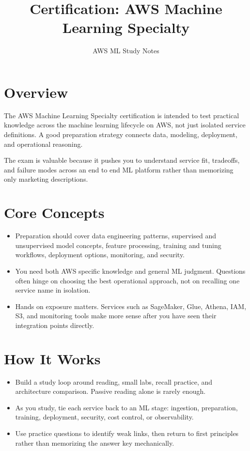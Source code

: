 \documentclass[10pt,twocolumn]{article}
\begin{document}
\title{\vspace{-1.6cm}Certification: AWS Machine Learning Specialty}
\author{AWS ML Study Notes}
\date{}
\maketitle
\small

\section*{Overview}
The AWS Machine Learning Specialty certification is intended to test practical knowledge across the machine learning lifecycle on AWS, not just isolated service definitions. A good preparation strategy connects data, modeling, deployment, and operational reasoning.

The exam is valuable because it pushes you to understand service fit, tradeoffs, and failure modes across an end to end ML platform rather than memorizing only marketing descriptions.

\section*{Core Concepts}
\begin{itemize}
\item Preparation should cover data engineering patterns, supervised and unsupervised model concepts, feature processing, training and tuning workflows, deployment options, monitoring, and security.
\item You need both AWS specific knowledge and general ML judgment. Questions often hinge on choosing the best operational approach, not on recalling one service name in isolation.
\item Hands on exposure matters. Services such as SageMaker, Glue, Athena, IAM, S3, and monitoring tools make more sense after you have seen their integration points directly.
\end{itemize}

\section*{How It Works}
\begin{itemize}
\item Build a study loop around reading, small labs, recall practice, and architecture comparison. Passive reading alone is rarely enough.
\item As you study, tie each service back to an ML stage: ingestion, preparation, training, deployment, security, cost control, or observability.
\item Use practice questions to identify weak links, then return to first principles rather than memorizing the answer key mechanically.
\end{itemize}
\end{document}
